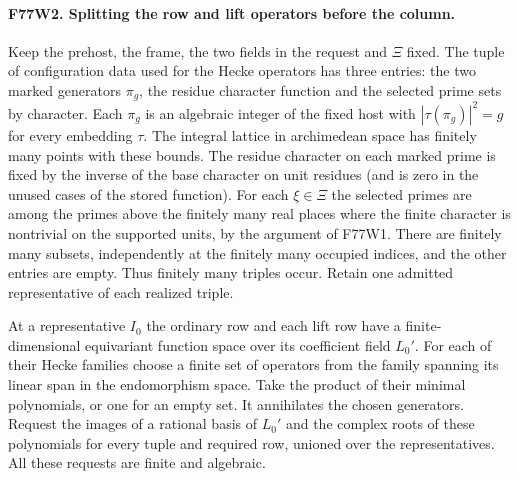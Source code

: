\paragraph{F77W2. Splitting the row and lift operators before the column.}
Keep the prehost, the frame, the two fields in the request and
$\Xi$ fixed. The tuple of configuration data used for the Hecke
operators has three entries: the two marked generators $\pi_g$,
the residue character function and the selected prime sets by
character. Each $\pi_g$ is an algebraic integer of the fixed host
with $|\tau(\pi_g)|^2=g$ for every embedding $\tau$. The
integral lattice in archimedean space has finitely many points
with these bounds. The residue character on each marked prime
is fixed by the inverse of the base character on unit residues
(and is zero in the unused cases of the stored function).
For each $\xi\in\Xi$ the selected primes are among the primes
above the finitely many real places where the finite character
is nontrivial on the supported units, by the argument of F77W1.
There are finitely many subsets, independently at the finitely
many occupied indices, and the other entries are empty. Thus
finitely many triples occur. Retain one admitted representative
of each realized triple.

At a representative $I_0$ the ordinary row and each lift row
have a finite-dimensional equivariant function space over its
coefficient field $L_0'$. For each of their Hecke families choose
a finite set of operators from the family spanning its linear
span in the endomorphism space. Take the product of their minimal
polynomials, or one for an empty set. It annihilates the chosen
generators. Request the images of a rational basis of $L_0'$ and
the complex roots of these polynomials for every tuple and required
row, unioned over the representatives. All these requests are
finite and algebraic.

